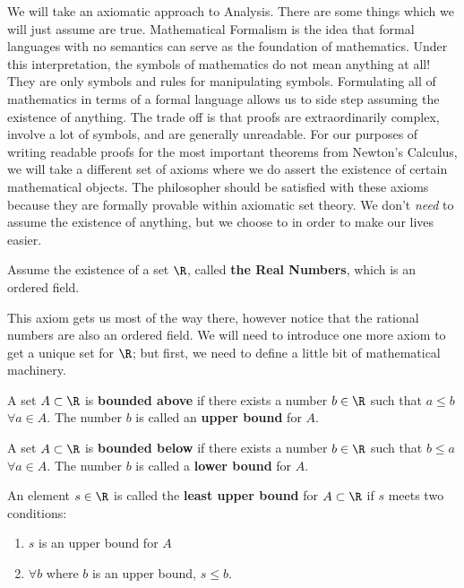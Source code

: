 
We will take an axiomatic approach to Analysis. There are some things which we will just assume are true. Mathematical Formalism is the idea that formal languages with no semantics can serve as the foundation of mathematics. Under this interpretation, the symbols of mathematics do not mean anything at all! They are only symbols and rules for manipulating symbols. Formulating all of mathematics in terms of a formal language allows us to side step assuming the existence of anything. The trade off is that proofs are extraordinarily complex, involve a lot of symbols, and are generally unreadable. For our purposes of writing readable proofs for the most important theorems from Newton's Calculus, we will take a different set of axioms where we do assert the existence of certain mathematical objects. The philosopher should be satisfied with these axioms because they are formally provable within axiomatic set theory. We don't \textit{need} to assume the existence of anything, but we choose to in order to  make our lives easier.
\begin{axiom}
	Assume the existence of a set $\R$, called \textbf{the Real Numbers}, which is an ordered field.	
\end{axiom}

This axiom gets us most of the way there, however notice that the rational numbers are also an ordered field. We will need to introduce one more axiom to get a unique set for $\R$; but first, we need to define a little bit of mathematical machinery.

\begin{definition}
	A set $A \subset \R$ is \textbf{bounded above} if there exists a number $b \in \R$ such that $a \le b$ $\forall a \in A$. The number $b$ is called an \textbf{upper bound} for $A$.
\end{definition}

\begin{definition}
	A set $A \subset \R$ is \textbf{bounded below} if there exists a number $b \in \R$ such that $b \le a$ $\forall a \in A$. The number $b$ is called a \textbf{lower bound} for $A$.
\end{definition}

\begin{definition}
	An element $s \in \R$ is called the \textbf{least upper bound} for $A \subset \R$ if $s$ meets two conditions:
	\begin{enumerate}
		\item $s$ is an upper bound for $A$
		\item $\forall b$ where $b$ is an upper bound, $s \le b$.
	\end{enumerate}
\end{definition}

